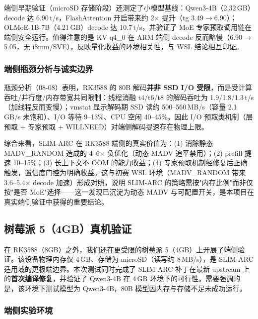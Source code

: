 端侧早期验证（microSD 存储阶段）还测定了小模型基线：Qwen3-4B（2.32\,GB）decode 达 6.90\,t/s，FlashAttention 开启带来约 2$\times$ 提升（tg 3.49$\to$6.90）；OLMoE-1B-7B（4.21\,GB）decode 达 10.7\,t/s，并验证了 MoE 专家预取调用链在端侧安全运行。值得注意的是 KV q4\_0 在 ARM 端侧 decode 反而略慢（6.90$\to$5.05，无 i8mm/SVE），反映量化收益的环境相关性，与 WSL 结论相互印证。

\subsubsection{端侧瓶颈分析与诚实边界}

瓶颈分析（08-08）表明，RK3588 的 80B 解码\textbf{并非 SSD I/O 受限}，而是受计算吞吐/并行度/内存带宽共同限制：线程消融 t4/t6/t8 的解码吞吐为 1.9/1.8/1.3\,t/s（加线程反而变慢）；vmstat 显示解码期 SSD 读约 500--560\,MB/s（容量 2.1\,GB/s 未饱和）、I/O 等待 9--13\%、CPU 空闲 40--45\%。因此 I/O 预取类机制（层预取 + 专家预取 + WILLNEED）对端侧解码提速存在物理上限。

综合来看，SLIM-ARC 在 RK3588 端侧的真实价值为：(1) 消除静态 MADV\_RANDOM 造成的 4--6$\times$ 负优化（动态 MADV 追平禁用）；(2) prefill 提速 10--15\%；(3) 长上下文不 OOM 的能力收益；(4) 专家预取机制经修复后正确触发，置信度门控为明确收益。这与初赛 WSL 环境（MADV\_RANDOM 带来 3.6--5.4$\times$ decode 加速）形成对照，说明 SLIM-ARC 的策略需按"内存比例"而非仅按"是否 MoE"选择——这一发现已沉淀为动态 MADV 与可配置开关，是本项目在真实端侧验证中获得的重要结论。

\subsection{树莓派 5（4GB）真机验证}

在 RK3588（8GB）之外，我们还在更受限的树莓派 5（4GB）上开展了端侧验证。该设备物理内存仅 4\,GB、存储为 microSD（读写约 8\,MB/s），是 SLIM-ARC 适用域的更极端边界。本次测试同时完成了 SLIM-ARC 补丁在最新 upstream 上的\textbf{首次编译修复}，并验证了 Qwen3-4B 在 4\,GB 环境下的可行性。需要强调的是，该环境下测试模型为 Qwen3-4B，80B 模型因内存与存储不足未成功运行。

\subsubsection{端侧实验环境}

